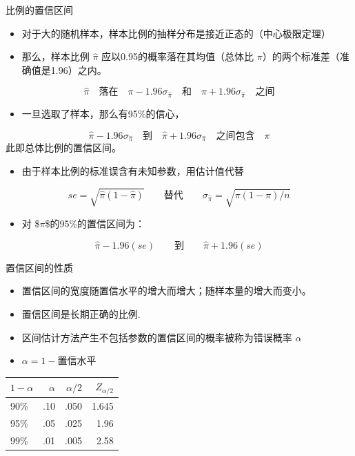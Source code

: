\documentclass[presentation]{beamer}
\begin{document}
\begin{frame}[label={sec:org4011502}]{比例的置信区间}
\begin{itemize}
\item 对于大的随机样本，样本比例的抽样分布是接近正态的（中心极限定理）

\item 那么，样本比例 \(\hat \pi\) 应以0.95的概率落在其均值（总体比 \(\pi\)）的两个标准差（准确值是1.96）之内。
\end{itemize}
$$\hat \pi \quad 落在 \quad \pi - 1.96\sigma_{\hat \pi} \quad 和 \quad \pi + 1.96\sigma_{\hat \pi} \quad 之间$$

\begin{itemize}
\item 一旦选取了样本，那么有95\%的信心，
\end{itemize}
$$\hat \pi - 1.96\sigma_{\hat \pi} \quad 到 \quad \hat \pi + 1.96\sigma_{\hat \pi} \quad 之间包含 \quad \pi$$
此即总体比例的置信区间。

\begin{itemize}
\item 由于样本比例的标准误含有未知参数，用估计值代替
\end{itemize}

$$se=\sqrt{\hat \pi (1- \hat \pi )} \qquad 替代 \qquad  \sigma_{\hat \pi}=\sqrt{\pi (1-\pi ) / n}$$


\begin{itemize}
\item 对 \$\(\pi\)\$的95\%的置信区间为：
\end{itemize}
$$\hat \pi - 1.96(se) \qquad 到 \qquad \hat \pi + 1.96(se)$$
\end{frame}

\begin{frame}[label={sec:org85c81ca}]{置信区间的性质}
\begin{itemize}
\item 置信区间的宽度随置信水平的增大而增大；随样本量的增大而变小。

\item 置信区间是长期正确的比例.

\item 区间估计方法产生不包括参数的置信区间的概率被称为错误概率 \(\alpha\)

\item \(\alpha = 1- 置信水平\)
\end{itemize}

\begin{center}
\begin{tabular}{lrrr}
\(1-\alpha\) & \(\alpha\) & \(\alpha /2\) & \(Z_{\alpha /2}\)\\
\hline
90\% & .10 & .050 & 1.645\\
95\% & .05 & .025 & 1.96\\
99\% & .01 & .005 & 2.58\\
\end{tabular}
\end{center}
\end{frame}
\end{document}
